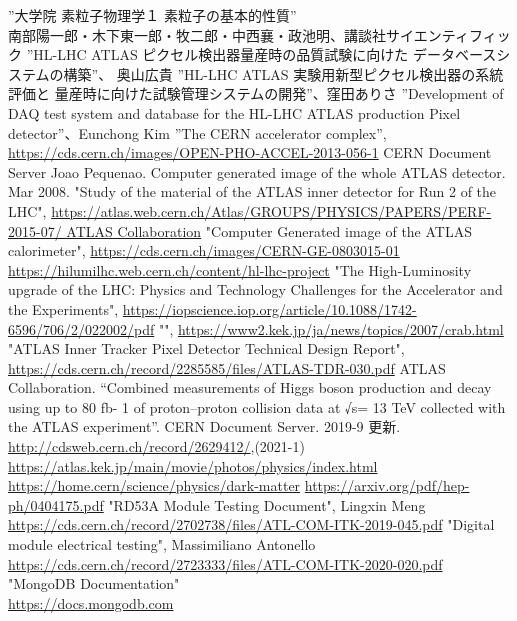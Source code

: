\begin{thebibliography}{24}
”大学院 素粒子物理学１ 素粒子の基本的性質” \\ 南部陽一郎・木下東一郎・牧二郎・中西襄・政池明、講談社サイエンティフィック
”HL-LHC ATLAS ピクセル検出器量産時の品質試験に向けた データベースシステムの構築”、 奥山広貴
”HL-LHC ATLAS 実験用新型ピクセル検出器の系統評価と 量産時に向けた試験管理システムの開発”、窪田ありさ
”Development of DAQ test system and database for the HL-LHC ATLAS production Pixel detector”、Eunchong Kim
”The CERN accelerator complex”,\\ \url{https://cds.cern.ch/images/OPEN-PHO-ACCEL-2013-056-1} CERN Document Server
Joao Pequenao. Computer generated image of the whole ATLAS detector. Mar 2008.
"Study of the material of the ATLAS inner detector for Run 2 of the LHC", \url{https://atlas.web.cern.ch/Atlas/GROUPS/PHYSICS/PAPERS/PERF-2015-07/ ATLAS Collaboration}
"Computer Generated image of the ATLAS calorimeter", \url{https://cds.cern.ch/images/CERN-GE-0803015-01}
\url{https://hilumilhc.web.cern.ch/content/hl-lhc-project}
"The High-Luminosity upgrade of the LHC: Physics and Technology Challenges for the Accelerator and the Experiments", \url{https://iopscience.iop.org/article/10.1088/1742-6596/706/2/022002/pdf}
"", \url{https://www2.kek.jp/ja/news/topics/2007/crab.html}
"ATLAS Inner Tracker Pixel Detector Technical Design Report", \url{https://cds.cern.ch/record/2285585/files/ATLAS-TDR-030.pdf}
ATLAS Collaboration. “Combined measurements of Higgs boson production and decay using up to 80 fb- 1 of proton–proton collision data at √s= 13 TeV collected with the ATLAS experiment”. CERN Document Server. 2019-9 更新. \url{http://cdsweb.cern.ch/record/2629412/},(2021-1)
\url{https://atlas.kek.jp/main/movie/photos/physics/index.html}
\url{https://home.cern/science/physics/dark-matter}
\url{https://arxiv.org/pdf/hep-ph/0404175.pdf}
"RD53A Module Testing Document", Lingxin Meng\\ \url{https://cds.cern.ch/record/2702738/files/ATL-COM-ITK-2019-045.pdf}
"Digital module electrical testing", Massimiliano Antonello\\ \url{https://cds.cern.ch/record/2723333/files/ATL-COM-ITK-2020-020.pdf}
"MongoDB Documentation" \\ \url{https://docs.mongodb.com}
\end{thebibliography}
